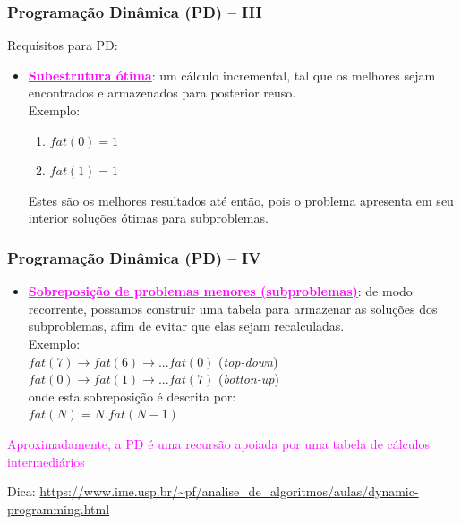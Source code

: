 \begin{frame}[fragile]
\frametitle{Programação Dinâmica (PD) -- III}

Requisitos para PD:

\pause
\begin{itemize}

  \item \textcolor{magenta}{\textbf{\underline{Subestrutura ótima}}}: um cálculo incremental, tal que os
  melhores sejam encontrados e armazenados para posterior reuso.\\
  Exemplo:\\
  \begin{enumerate}
    \item $fat(0) = 1$ 
    \item $fat(1) = 1$
  \end{enumerate}
   Estes são os melhores resultados até então, pois 
   o problema apresenta em seu interior soluções ótimas para subproblemas. 

\end{itemize}
\end{frame}

   
\begin{frame}[fragile]
\frametitle{Programação Dinâmica (PD) -- IV}

   
\begin{itemize}

  \item \textcolor{magenta}{\textbf{\underline{Sobreposição de problemas menores (subproblemas)}}}: de modo recorrente, possamos
  construir uma 
  tabela para armazenar as soluções dos subproblemas, afim de evitar que elas sejam recalculadas.\\
  Exemplo:\\
  $fat(7) \rightarrow fat(6) \rightarrow ... fat(0) $ (\textit{top-down})\\ 
  $fat(0) \rightarrow fat(1) \rightarrow ... fat(7) $ (\textit{botton-up})\\ 
  onde esta sobreposição é descrita por:\\
  $fat(N) = N . fat(N-1)$
   
\end{itemize}

\begin{center}
\textcolor{magenta}{Aproximadamente, a PD é  uma recursão apoiada por uma tabela de cálculos intermediários}
\end{center}

Dica: \url{https://www.ime.usp.br/~pf/analise_de_algoritmos/aulas/dynamic-programming.html}
\end{frame}




